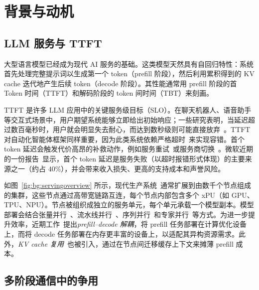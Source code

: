 \section{背景与动机}\label{sec:background}

\subsection{LLM 服务与 TTFT}



大型语言模型已经成为现代 AI 服务的基础。这类模型天然具有自回归特性：系统首先处理完整提示词以生成第一个 token（prefill 阶段），然后利用累积得到的 KV cache 迭代地产生后续 token（decode 阶段）。其性能通常用 prefill 阶段的首 Token 时间（TTFT）和解码阶段的 token 间时间（TBT）来刻画。

TTFT 是许多 LLM 应用中的关键服务级目标（SLO）。在聊天机器人、语音助手等交互式场景中，用户期望系统能够立即给出初始响应；一些研究表明，当延迟超过数百毫秒时，用户就会明显失去耐心，而达到数秒级则可能直接放弃~\cite{vijaya2025aqua,liu2025m,kim2025seconds}。TTFT 对自动化智能体框架同样重要，因为此类系统依赖严格超时~\cite{langfuse,LiteLLM}来实现容错。首个 token 延迟会触发代价高昂的补救动作，例如服务重试~\cite{Medium1,Medium2}或服务商切换~\cite{notdiamond}。微软近期的一份报告~\cite{ranganathan2025enhancing}显示，首个 token 延迟是服务失败（以超时报错形式体现）的主要来源之一（约占 40\%），并会带来收入损失、更高的支持成本和声誉风险。

如图~\ref{fig:bg:servingoverview} 所示，现代生产系统~\cite{mooncake,deepseektech}通常扩展到由数千个节点组成的集群，这些节点通过高带宽链路互连，每个节点内部包含多个 xPU（如 GPU、TPU、NPU）。节点被组织成独立的服务单元，每个单元承载一个模型副本。模型部署会结合张量并行~\cite{narayanan2021efficient}、流水线并行~\cite{narayanan2019pipedream, alphaserve}、序列并行~\cite{ringattention,wu2024loongserve,CP}和专家并行~\cite{expertparallel,deepspeedMoE,deepseektech,comet}等方式。为进一步提升效率，近期工作~\cite{distserve,splitwise,strati2024d,hu2024inference}提出\emph{prefill--decode 解耦}，将 prefill 任务部署在计算优化设备上，而将 decode 任务部署在内存更丰富的设备上，以适配其异构资源需求。此外，\emph{KV cache 复用}~\cite{mooncakefast,hu2024memserve,cachedattention,cacheblend}也被引入，通过在节点间迁移缓存上下文来摊薄 prefill 成本。




\subsection{多阶段通信中的争用}

